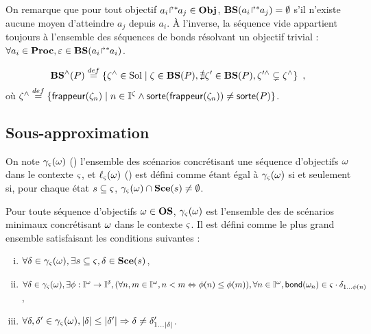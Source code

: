 On remarque que pour tout objectif ${a_i\!\Rsh^*\!\!a_j} \in \mathbf{Obj}$,
$\mathbf{BS}({a_i\!\Rsh^*\!\!a_j}) = \emptyset$ s'il n'existe aucune moyen d'atteindre $a_j$ depuis $a_i$.
À l'inverse, la séquence vide appartient toujours à
l'ensemble des séquences de bonds résolvant un objectif trivial :
$\forall a_i \in \mathbf{Proc}, \varepsilon \in \mathbf{BS}({a_i\!\Rsh^*\!\!a_i})$.

\begin{definition}
  \[
    \mathbf{BS}^\wedge(P) \stackrel{def}= \{ \zeta^\wedge \in \mathrm{Sol} \mid \zeta \in \mathbf{BS}(P), \nexists \zeta' \in \mathbf{BS}(P), \zeta'^\wedge \subsetneq \zeta^\wedge \} \enspace,
  \]
  où $\zeta^\wedge \stackrel{def}= \{ \mathsf{frappeur}(\zeta_n) \mid  n \in \mathbb{I}^{\zeta} \wedge \mathsf{sorte}(\mathsf{frappeur}(\zeta_n)) \neq \mathsf{sorte}(P) \}$.
\end{definition}

\subsection{Sous-approximation}

On note $\gamma_\varsigma(\omega)$ () l'ensemble des scénarios concrétisant
une séquence d'objectifs $\omega$ dans le contexte $\varsigma$,
et $\ell_\varsigma(\omega)$ () est défini comme étant égal à $\gamma_\varsigma(\omega)$ si et seulement si,
pour chaque état $s \subseteq \varsigma$,
$\gamma_\varsigma(\omega) \cap \mathbf{Sce}(s) \neq \emptyset$.

\begin{definition}[$\concr : \OS \to \powerset(\Sce)$]
  Pour toute séquence d'objectifs $\omega \in \mathbf{OS}$, $\gamma_\varsigma(\omega)$ est l'ensemble des
  de scénarios minimaux concrétisant $\omega$ dans le contexte $\varsigma$.
  Il est défini comme le plus grand ensemble satisfaisant les conditions suivantes :
  \begin{enumerate}[(i)]
  \item $\forall \delta \in \gamma_\varsigma(\omega), \exists s \subseteq \varsigma, \delta \in \mathbf{Sce}(s)$,
  \item $\forall \delta \in \gamma_\varsigma(\omega), \exists \phi : \mathbb{I}^{\omega} \to \mathbb{I}^{\delta},
      (\forall n, m \in \mathbb{I}^{\omega}, n < m \Leftrightarrow \phi(n) \leq \phi(m)),
      \forall n \in \mathbb{I}^{\omega}, \mathsf{bond}(\omega_n) \in \varsigma \cdot \delta_{1 \ldots \phi(n)}$,
  \item $\forall \delta, \delta' \in \gamma_\varsigma(\omega),
      |\delta| \leq |\delta'| \Rightarrow \delta \neq \delta'_{1 \ldots |\delta|}$.
  \end{enumerate}
\end{definition}

